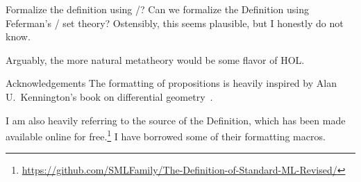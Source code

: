 \begin{comment}{Phases to the definition}
Again, we find in the first chapter of the 1997 Definition, the authors
explain (emphasis theirs):
\begin{quotation}
ML is an interactive language, and a \emph{program} consists of a
sequence of \emph{top-level declarations}; the execution of each
declaration modifies the top-level environment, which we call a
\emph{basis}, and reports the modification to the user.

In the execution of a declaration there are three phases:
\emph{parsing}, \emph{elaboration}, and \emph{evaluation}. Parsing
determines the grammatical form of a declaration. Elaboration, the
\emph{static} phase, determines whether it is well-typed and well-formed
in other ways, and records relevant type or form information in the
basis. Finally evaluation, the \emph{dynamic} phase, determines the
value of the declaration and records relevant value information in the
basis. Corresponding to these phases, our formal definition divides
into three parts: grammatical rules, elaboration rules, and evaluation
rules. Furthermore, the basis is divided into the \emph{static} basis
and the \emph{dynamic} basis; for example, a variable which has been
declared is associated with a type in the static basis and with a value
in the dynamic basis.
\end{quotation}
This gives us a clean way to order our discussion into three phases
(parsing, elaboration, and evaluation) and two sublanguages (Core and
Module). Since the Definition itself is structured in this manner, we
could use that fact to mirror its structure in our text.
\end{comment}

\begin{puzzle}{Formalize the definition using /?}
Can we formalize the Definition using Feferman's / set theory?
Ostensibly, this seems plausible, but I honestly do not know.

Arguably, the more natural metatheory would be some flavor of HOL.
\end{puzzle}

\begin{remark}{Acknowledgements}
The formatting of propositions is heavily inspired by Alan
U.\ Kennington's book on differential geometry~\cite{kennington2024dg}.

I am also heavily referring to the source of the Definition,
which has been made available online for free.\footnote{\url{https://github.com/SMLFamily/The-Definition-of-Standard-ML-Revised/}}
I have borrowed some of their formatting macros.
\end{remark}